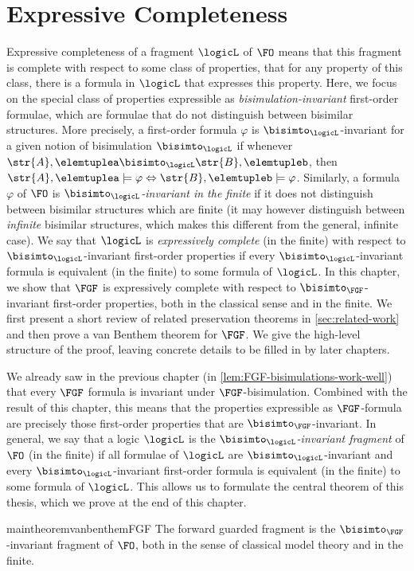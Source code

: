 \chapter{Expressive Completeness}\label{chap:expressivity}
Expressive completeness of a fragment $\logicL$ of $\FO$ means that this fragment is complete with respect to some class of properties, \ie{} that for any property of this class, there is a formula in $\logicL$ that expresses this property.
Here, we focus on the special class of properties expressible as \emph{bisimulation-invariant} first-order formulae, which are formulae that do not distinguish between bisimilar structures.
More precisely, a first-order formula $\varphi$ is $\bisimto_{\logicL}$-invariant for a given notion of bisimulation $\bisimto_{\logicL}$ if whenever $\str{A}, \elemtuplea \bisimto_{\logicL} \str{B}, \elemtupleb$, then $\str{A}, \elemtuplea \models \varphi \Leftrightarrow \str{B}, \elemtupleb \models \varphi$.
Similarly, a formula $\varphi$ of $\FO$ is \emph{$\bisimto_{\logicL}$-invariant in the finite} if it does not distinguish between bisimilar structures which are finite (it may however distinguish between \emph{infinite} bisimilar structures, which makes this different from the general, infinite case).
We say that $\logicL$ is \emph{expressively complete} (in the finite) with respect to $\bisimto_{\logicL}$-invariant first-order properties if every $\bisimto_{\logicL}$-invariant formula is equivalent (in the finite) to some formula of $\logicL$.
In this chapter, we show that $\FGF$ is expressively complete with respect to $\bisimto_{\FGF}$-invariant first-order properties, both in the classical sense and in the finite.
We first present a short review of related preservation theorems in \cref{sec:related-work} and then prove a van Benthem theorem for $\FGF$.
We give the high-level structure of the proof, leaving concrete details to be filled in by later chapters.

We already saw in the previous chapter (in \cref{lem:FGF-bisimulations-work-well}) that every $\FGF$ formula is invariant under $\FGF$-bisimulation.
Combined with the result of this chapter, this means that the properties expressible as $\FGF$-formula are precisely those first-order properties that are $\bisimto_{\FGF}$-invariant.
In general, we say that a logic $\logicL$ is the \emph{$\bisimto_{\logicL}$-invariant fragment} of $\FO$ (in the finite) if all formulae of $\logicL$ are $\bisimto_{\logicL}$-invariant and every $\bisimto_{\logicL}$-invariant first-order formula is equivalent (in the finite) to some formula of $\logicL$.
This allows us to formulate the central theorem of this thesis, which we prove at the end of this chapter.
\begin{restatable*}{maintheorem}{vanbenthemFGF}\label{thm:main}
The forward guarded fragment is the $\bisimto_{\FGF}$-invariant fragment of $\FO$, both in the sense of classical model theory and in the finite.
\end{restatable*}

